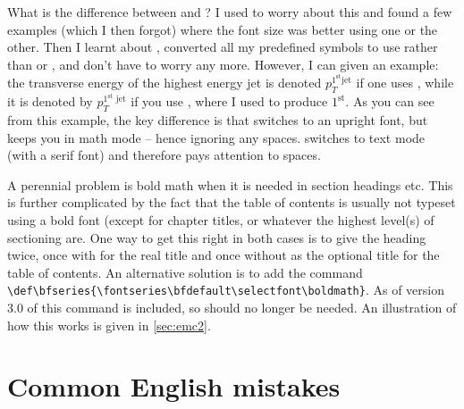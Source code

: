What is the difference between  and
? I used to worry about this and found a
few examples (which I then forgot) where the font size was better
using one or the other. Then I learnt about ,
converted all my predefined symbols to use  rather than
 or , and don't have to worry any
more. However, I can given an example: the transverse energy of the
highest energy jet is denoted $p_{T}^{\mathrm{1^{\text{st}} jet}}$ if
one uses , while it is denoted by
$p_{T}^{\textrm{1$^{\text{st}}$ jet}}$ if you use ,
where I used  to produce $1^{\text{st}}$.  As you can see
from this example, the key difference is that  switches
to an upright font, but keeps you in math mode -- hence ignoring any
spaces.  switches to text mode (with a serif font) and
therefore pays attention to spaces.

A perennial problem is bold math when it is needed in
section headings etc. This is further complicated by the fact that the
table of contents is usually not typeset using a bold font (except for
chapter titles, or whatever the highest level(s) of sectioning are.
One way to get this right in both cases is to give the
heading twice, once with  for the real title and once
without as the optional title for the table of contents.
An alternative solution is to add the command\\
\verb|\def\bfseries{\fontseries\bfdefault\selectfont\boldmath}|.
As of version 3.0 of  this command is included,
so  should no longer be needed.
An illustration of how this works is given in \cref{sec:emc2}.


\section{Common English mistakes}
\label{sec:tips:english}

